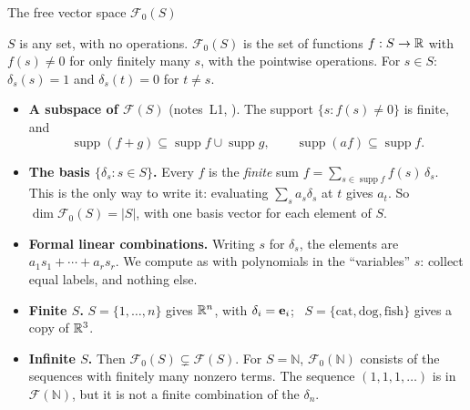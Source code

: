 \documentclass[aspectratio=1610,11pt]{beamer}
\begin{document}
\begin{frame}{The free vector space $\mathcal{F}_0(S)$}
    \begin{definition}
        \small $S$ is any set, with no operations. $\mathcal{F}_0(S)$ is the set of functions $f: S \to \mathbb{R}$ with $f(s) \neq 0$ for only finitely many $s$, with the pointwise operations. For $s \in S$: \ $\delta_s(s) = 1$ and $\delta_s(t) = 0$ for $t \neq s$.
    \end{definition}
    \small
    \begin{itemize}
        \item \textbf{A subspace of $\mathcal{F}(S)$} (notes~L1, ). The support $\{s : f(s) \neq 0\}$ is finite, and
        \[\operatorname{supp}(f + g) \subseteq \operatorname{supp} f \cup \operatorname{supp} g, \qquad \operatorname{supp}(af) \subseteq \operatorname{supp} f.\]
        \item \textbf{The basis $\{\delta_s : s \in S\}$.} Every $f$ is the \emph{finite} sum $f = \sum_{s \in \operatorname{supp} f} f(s)\,\delta_s$. This is the only way to write it: evaluating $\sum_s a_s\delta_s$ at $t$ gives $a_t$. So $\dim\mathcal{F}_0(S) = |S|$, with one basis vector for each element of $S$.
        \item \textbf{Formal linear combinations.} Writing $s$ for $\delta_s$, the elements are $a_1s_1 + \cdots + a_rs_r$. We compute as with polynomials in the ``variables'' $s$: collect equal labels, and nothing else.
        \item \textbf{Finite $S$.} $S = \{1, \ldots, n\}$ gives $\mathbb{R}^n$, with $\delta_i = \mathbf{e}_i$; \ $S = \{\text{cat}, \text{dog}, \text{fish}\}$ gives a copy of $\mathbb{R}^3$.
        \item \textbf{Infinite $S$.} Then $\mathcal{F}_0(S) \subsetneq \mathcal{F}(S)$. For $S = \mathbb{N}$, $\mathcal{F}_0(\mathbb{N})$ consists of the sequences with finitely many nonzero terms. The sequence $(1, 1, 1, \ldots)$ is in $\mathcal{F}(\mathbb{N})$, but it is not a finite combination of the $\delta_n$.
    \end{itemize}
\end{frame}
\end{document}
